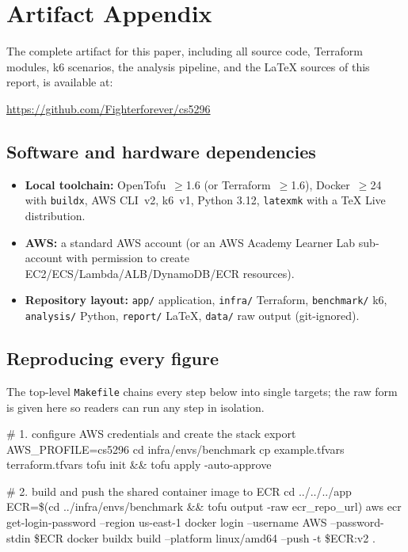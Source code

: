 \appendix
\section*{Artifact Appendix}
\renewcommand{\thesubsection}{A.\arabic{subsection}}

The complete artifact for this paper, including all source code,
Terraform modules, k6 scenarios, the analysis pipeline, and the LaTeX
sources of this report, is available at:

\begin{center}
\url{https://github.com/Fighterforever/cs5296}
\end{center}

\subsection{Software and hardware dependencies}
\begin{itemize}[leftmargin=*,topsep=2pt,itemsep=2pt]
\item \textbf{Local toolchain:} OpenTofu~$\geq$1.6 (or Terraform~$\geq$1.6),
      Docker~$\geq$24 with \texttt{buildx}, AWS CLI~v2, k6~v1, Python 3.12,
      \texttt{latexmk} with a TeX Live distribution.
\item \textbf{AWS:} a standard AWS account (or an AWS Academy Learner Lab sub-account with
      permission to create EC2/ECS/Lambda/ALB/DynamoDB/ECR resources).
\item \textbf{Repository layout:} \texttt{app/} application, \texttt{infra/}
      Terraform, \texttt{benchmark/} k6, \texttt{analysis/} Python,
      \texttt{report/} \LaTeX, \texttt{data/} raw output (git-ignored).
\end{itemize}

\subsection{Reproducing every figure}
The top-level \texttt{Makefile} chains every step below into single
targets; the raw form is given here so readers can run any step in
isolation.

\begingroup
\small\ttfamily
\setlength{\parindent}{0pt}
\obeylines%
\# 1. configure AWS credentials and create the stack
export AWS\_PROFILE=cs5296
cd infra/envs/benchmark
cp example.tfvars terraform.tfvars
tofu init \&\& tofu apply -auto-approve

\# 2. build and push the shared container image to ECR
cd ../../../app
ECR=\$(cd ../infra/envs/benchmark \&\& tofu output -raw ecr\_repo\_url)
aws ecr get-login-password --region us-east-1 \textbar{} docker login --username AWS --password-stdin \$ECR
docker buildx build --platform linux/amd64 --push -t \$ECR:v2 .

